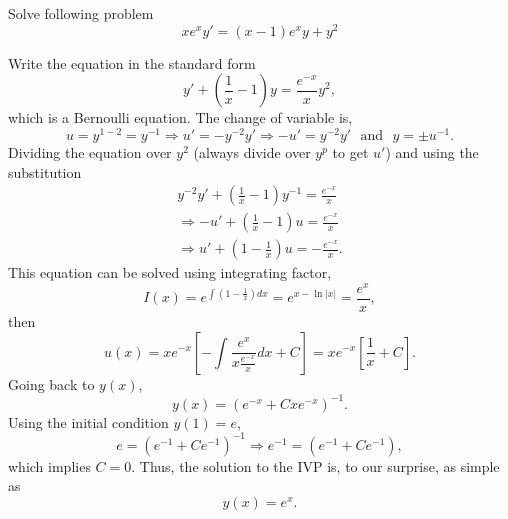 \documentclass[11pt]{article}
\begin{document}




\begin{problem}
Solve following problem
\begin{equation*}
      xe^{x}y'= (x-1)e^{x}y+y^{2}
\end{equation*}
\end{problem}
\begin{solution}
Write the equation in the standard form
\[y'+\left( \frac{1}{x} - 1 \right)y=\frac{e^{-x}}{x}y^{2},\]
which is a Bernoulli equation. The change of variable is,
\[u = y^{1-2}=y^{-1}\Rightarrow u'=- y^{-2}y' \Rightarrow -u'= y^{-2}y' \,\,\text{ and }\,\, y = \pm u^{-1}.\]
Dividing the equation over $y^{2}$ (always divide over $y^{p}$ to get $u'$) and using the substitution
\begin{gather*}
y^{-2}y'+\left( \frac{1}{x} - 1 \right)y^{-1}=\frac{e^{-x}}{x} \\
\Rightarrow -u' + \left( \frac{1}{x} - 1 \right)u=\frac{e^{-x}}{x} \\
\Rightarrow u' + \left( 1 - \frac{1}{x} \right) u= -\frac{e^{-x}}{x}.
\end{gather*}
This equation can be solved using integrating factor,
\[I(x)=e^{\int\left( 1 - \frac{1}{x} \right) dx}=e^{x - \ln |x|}=\frac{e^{x}}{x},\]
then
\[u(x)= xe^{-x}\left[-\int \frac{e^{x}}{x\frac{e^{-x}}{x}} dx + C\right]= xe^{-x}\left[\frac{1}{x} + C \right].\]
Going back to $y(x)$,
\[y(x)= \left( e^{-x}  + Cxe^{-x} \right)^{-1}.\]
Using the initial condition $y(1)=e$,
\[e=\left( e^{-1}  + Ce^{-1} \right)^{-1}\Rightarrow e^{-1}=\left( e^{-1}  + Ce^{-1} \right),\]
which implies $C=0$. Thus, the solution to the IVP is, to our surprise, as simple as
\[\boxed{y(x)= e^{x}}.\]
\end{solution}
\end{document}
